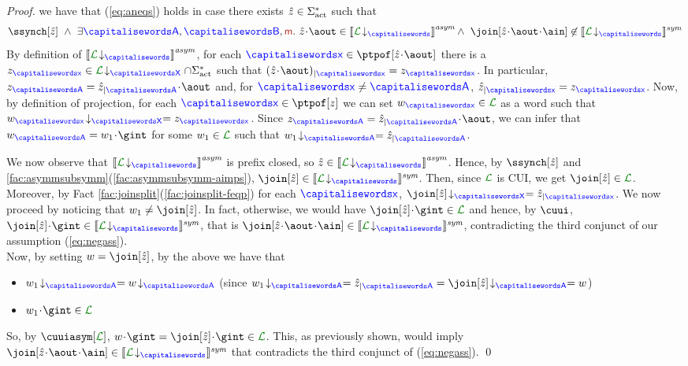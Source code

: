 \begin{proof}
 we have that  (\ref{eq:aneqs}) holds in case there exists $\hat z \in\Sigma_{\text{act}}^*$ such that
 \begin{equation}
 \label{eq:negass}
 \ssynch[\hat z]\ \land\ \exists \p,\q,\msg[m].\  \hat z\cat\aout \in \asem{\proj{\clang}{}} \land\  \join[{\hat z\cat\aout\cat\ain}]\not\in\ssem{\proj{\clang}{}}
 \end{equation}
 By definition of $\asem{\proj{\clang}{}}$, 
for each $\px\in\ptpof[\hat z\cat\aout]$  there is a $z_{\px}\in\proj{\clang}{X}\cap\alfact^*$ such that
$\filter{(\hat z\cat\aout)}{\px}=z_{\px}$. In particular, $z_{\p}= \filter{\hat z}{\p}\cat\aout$ and,
for  $\px\neq\p$, $\filter{\hat z}{\px}=z_{\px}$.
Now, by definition of projection,  for each $\px\in\ptpof[z]$ we can set $\acword_{\px}\in\clang$
as a word such that  $\proj{\acword_{\px}}{X}= z_{\px}$. 
Since $z_{\p}= \filter{\hat z}{\p}\cat\aout$, we can infer that  
$\acword_{\p}= \acword_1\cat\gint$ for some $\acword_1\in\clang$ such that
$\proj{\acword_1}{A}= \filter{\hat z}{\p}$. 
 
 We now observe that  $\asem{\proj{\clang}{}}$ is prefix closed, 
so $\hat z\in \asem{\proj{\clang}{}}$. 
Hence, by $ \ssynch[\hat z]$ and  
\cref{fac:asymmsubsymm}(\ref{fac:asymmsubsymm-aimps}), 
$\join[\hat z]\in\ssem{\proj{\clang}{}}$. Then,
since $\clang$ is CUI, we get $\join[\hat z]\in\clang$. 
Moreover, by Fact \ref{fac:joinsplit}(\ref{fac:joinsplit-feqp}) for each $\px$,
$\proj{\join[\hat z]}{X}=\filter{\hat z}{\px}$. 
We now proceed by noticing that $\acword_1\neq\join[\hat z]$. In fact, otherwise, we would have $\join[\hat z]\cat\gint\in\clang$
and hence, by $\cuui$, 
${\join[\hat z]}\cat\gint\in\ssem{\proj{\clang}{}}$, 
that is $\join[{\hat z\cat\aout\cat\ain}]\in\ssem{\proj{\clang}{}}$,
contradicting the third conjunct of our assumption (\ref{eq:negass}).\\
 Now, by setting $\acword=\join[\hat z]$, by the above
we have that
\begin{itemize}
\item
$\proj{\acword_1}{A} = \proj{\acword}{A}$\qquad 
(since $\proj{\acword_1}{A}=\filter{\hat z}{\p}=\proj{\join[\hat z]}{A}=\acword$)
\item
$\acword_1\cat\gint\in\clang$
\end{itemize} 
So, by $\cuuiasym[\clang]$, $\acword\cat\gint=\join[\hat z]\cat\gint\in\clang$. 
This, as previously shown, would imply  $\join[{\hat z\cat\aout\cat\ain}]\in\ssem{\proj{\clang}{}}$ that contradicts the third conjunct of (\ref{eq:negass}).
\qed
 \end{proof}
 

